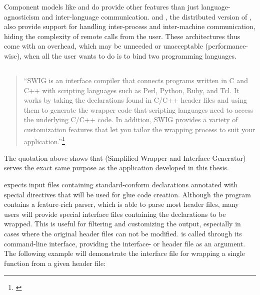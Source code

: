 
Component models like  and  do provide other features than just \linebreak language-agnosticism and inter-language communication.  and , the distributed version of , also provide support for handling inter-process and inter-machine communication, hiding the complexity of remote calls from the user. These architectures thus come with an overhead, which may be unneeded or unacceptable (performance-wise), when all the user wants to do is to bind two programming languages.


\newpage
\subsection{}

\begin{quotation}
``SWIG is an interface compiler that connects programs written in C and C++ with scripting languages such as Perl, Python, Ruby, and Tcl. It works by taking the declarations found in C/C++ header files and using them to generate the wrapper code that scripting languages need to access the underlying C/C++ code. In addition, SWIG provides a variety of customization features that let you tailor the wrapping process to suit your application.''\footnote{\citep{SWIGHPExec}}
\end{quotation}

The quotation above shows that  (Simplified Wrapper and Interface Generator) serves the exact same purpose as the application developed in this thesis.

 expects input files containing standard-conform  declarations annotated with special  directives that will be used for glue code creation. Although the program contains a feature-rich  parser, which is able to parse most  header files, many users will provide special  interface files containing the declarations to be wrapped. This is useful for filtering and customizing the output, especially in cases where the original header files can not be modified.  is called through its command-line interface, providing the interface- or header file as an argument.
\\The following example will demonstrate the interface file for wrapping a single function from a given header file:

